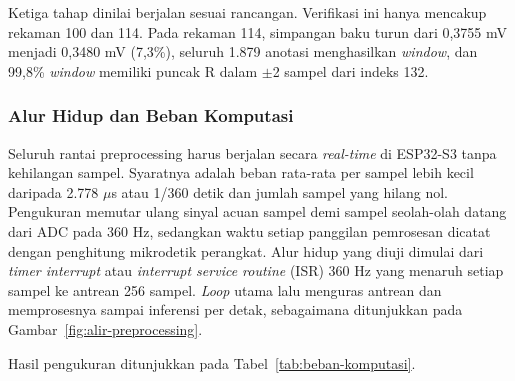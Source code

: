 Ketiga tahap dinilai berjalan sesuai rancangan. Verifikasi ini hanya mencakup rekaman 100 dan 114. Pada rekaman 114, simpangan baku turun dari 0,3755 mV menjadi 0,3480 mV (7,3\%), seluruh 1.879 anotasi menghasilkan \textit{window}, dan 99,8\% \textit{window} memiliki puncak R dalam $\pm$2 sampel dari indeks 132.

\subsubsection{Alur Hidup dan Beban Komputasi}

Seluruh rantai preprocessing harus berjalan secara \textit{real-time} di ESP32-S3 tanpa kehilangan sampel. Syaratnya adalah beban rata-rata per sampel lebih kecil daripada 2.778 $\mu$s atau 1/360 detik dan jumlah sampel yang hilang nol. Pengukuran memutar ulang sinyal acuan sampel demi sampel seolah-olah datang dari ADC pada 360 Hz, sedangkan waktu setiap panggilan pemrosesan dicatat dengan penghitung mikrodetik perangkat. Alur hidup yang diuji dimulai dari \textit{timer interrupt} atau \textit{interrupt service routine} (ISR) 360 Hz yang menaruh setiap sampel ke antrean 256 sampel. \textit{Loop} utama lalu menguras antrean dan memprosesnya sampai inferensi per detak, sebagaimana ditunjukkan pada Gambar~\ref{fig:alir-preprocessing}.

Hasil pengukuran ditunjukkan pada Tabel~\ref{tab:beban-komputasi}.

